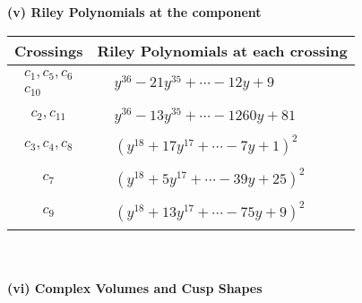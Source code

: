 \documentclass[1p]{elsarticle_modified}
\theoremstyle{definition}
\begin{document}
\flushleft \textbf{(v) Riley Polynomials at the component}\newline \\
\begin{tabular}{m{50pt}|m{274pt}}
Crossings & \hspace{64pt}Riley Polynomials at each crossing \\
\hline $$\begin{aligned}c_{1},c_{5},c_{6}\\c_{10}\end{aligned}$$&$\begin{aligned}
&y^{36}-21 y^{35}+\cdots-12 y+9
\end{aligned}$\\
\hline $$\begin{aligned}c_{2},c_{11}\end{aligned}$$&$\begin{aligned}
&y^{36}-13 y^{35}+\cdots-1260 y+81
\end{aligned}$\\
\hline $$\begin{aligned}c_{3},c_{4},c_{8}\end{aligned}$$&$\begin{aligned}
&(y^{18}+17 y^{17}+\cdots-7 y+1)^{2}
\end{aligned}$\\
\hline $$\begin{aligned}c_{7}\end{aligned}$$&$\begin{aligned}
&(y^{18}+5 y^{17}+\cdots-39 y+25)^{2}
\end{aligned}$\\
\hline $$\begin{aligned}c_{9}\end{aligned}$$&$\begin{aligned}
&(y^{18}+13 y^{17}+\cdots-75 y+9)^{2}
\end{aligned}$\\
\hline
\end{tabular}\\~\\
\newpage\flushleft \textbf{(vi) Complex Volumes and Cusp Shapes}
\end{document}

